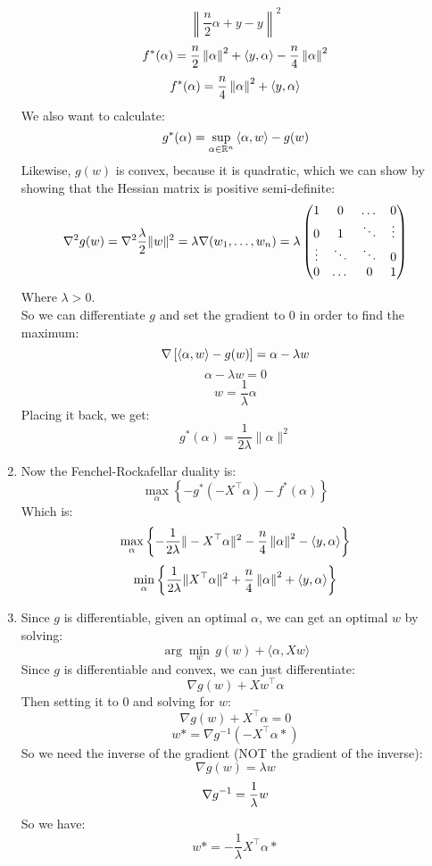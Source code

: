 \documentclass[12pt]{article}
\begin{document}
\begin{enumerate}[label = \letters]
\[    \left\| \dfrac{n}{2}\alpha + y - y\right\|^2 \]
    \[ f^*(\alpha) = \dfrac{n}{2}\left\| \alpha\right\|^2 
    + \left\langle y, \alpha \right\rangle - 
    \dfrac{n}{4}\left\|\alpha\right\|^2 \]
    \[ f^*(\alpha) = \dfrac{n}{4}\left\|\alpha\right\|^2 + 
    \left\langle y, \alpha \right\rangle \]
    We also want to calculate:
    \[ g^*(\alpha) = \sup_{\alpha \in \mathbb{R}^n} 
    \left\langle \alpha, w \right\rangle - g(w) \]
    Likewise, $g(w)$ is convex, because it is quadratic,
    which we can show by showing that the Hessian
    matrix is positive semi-definite:
    \[ \nabla^2 g(w) 
    = \nabla^2 \dfrac{\lambda}{2}\|w\|^2
    = \lambda  \nabla (w_1, \dots, w_n)
    = \lambda \begin{pmatrix} 1 & 0 & \dots & 0 \\
    0 & 1 & \ddots & \vdots \\
    \vdots & \ddots & \ddots & 0 \\
    0 & \dots & 0 & 1 \end{pmatrix} \]
    Where $\lambda > 0$. \\
    So we can differentiate $g$ and set the gradient
    to $0$ in order to find the maximum:
    \[ \nabla \left[ \left\langle \alpha, w \right\rangle - g(w) \right]
    = \alpha - \lambda w \]
    \[ \alpha - \lambda w = 0 \]
    \[ w = \dfrac{1}{\lambda} \alpha \]
    Placing it back, we get:
    \[ g^*(\alpha) = \dfrac{1}{2\lambda}\|\alpha\|^2\]
    \item
    Now the Fenchel-Rockafellar duality is:
    \[ \max_{\alpha} \left\{ -g^*(-X^\top \alpha) 
    - f^*(\alpha) \right\} \]
    Which is:
    \[ \max_{\alpha} \left\{ 
    -\dfrac{1}{2\lambda}\|-X^\top\alpha\|^2
    - \dfrac{n}{4}\left\|\alpha\right\|^2
    - \left\langle y, \alpha \right\rangle \right\} \]
    \[ \min_{\alpha} \left\{ 
    \dfrac{1}{2\lambda}\|X^\top\alpha\|^2
    + \dfrac{n}{4}\left\|\alpha\right\|^2
    + \left\langle y, \alpha \right\rangle \right\} \]
    \item 
    Since $g$ is differentiable, given an optimal $\alpha$,
    we can get an optimal $w$ by solving:
    \[\arg\min_{w} \, g(w) 
    + \langle \alpha, Xw\rangle\]
    Since $g$ is differentiable and convex,
    we can just differentiate:
    \[\nabla g(w) + Xw^\top \alpha \]
    Then setting it to $0$ and solving for $w$:
    \[ \nabla g(w) + X^\top \alpha = 0 \]
    \[ w* = \nabla g^{-1}(-X^\top \alpha*) \]
    So we need the inverse of the gradient
    (NOT the gradient of the inverse):
    \[ \nabla g(w) = \lambda w \]
    \[ \nabla g^{-1} = \dfrac{1}{\lambda}w \]
    So we have:
    \[ w* = -\dfrac{1}{\lambda}X^\top \alpha* \]
\end{enumerate}
\end{document}
